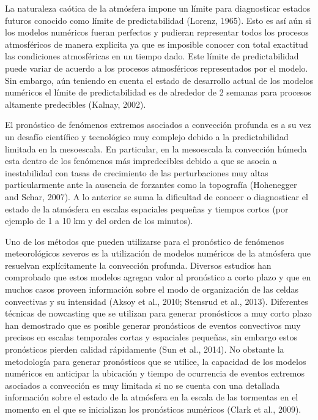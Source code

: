 \documentclass[12pt,oneside,a4paper]{reedthesis}
\begin{document}
La naturaleza caótica de la atmósfera impone un límite para diagnosticar estados futuros conocido como límite de predictabilidad (Lorenz, 1965). Esto es así aún si los modelos numéricos fueran perfectos y pudieran representar todos los procesos atmosféricos de manera explicita ya que es imposible conocer con total exactitud las condiciones atmosféricas en un tiempo dado. Este límite de predictabilidad puede variar de acuerdo a los procesos atmosféricos representados por el modelo. Sin embargo, aún teniendo en cuenta el estado de desarrollo actual de los modelos numéricos el límite de predictabilidad es de alrededor de 2 semanas para procesos altamente predecibles (Kalnay, 2002).

El pronóstico de fenómenos extremos asociados a convección profunda es a su vez un desafío científico y tecnológico muy complejo debido a la predictabilidad limitada en la mesoescala. En particular, en la mesoescala la convección húmeda esta dentro de los fenómenos más impredecibles debido a que se asocia a inestabilidad con tasas de crecimiento de las perturbaciones muy altas particularmente ante la ausencia de forzantes como la topografía (Hohenegger and Schar, 2007). A lo anterior se suma la dificultad de conocer o diagnosticar el estado de la atmósfera en escalas espaciales pequeñas y tiempos cortos (por ejemplo de 1 a 10 km y del orden de los minutos).

Uno de los métodos que pueden utilizarse para el pronóstico de fenómenos meteorológicos severos es la utilización de modelos numéricos de la atmósfera que resuelvan explícitamente la convección profunda. Diversos estudios han comprobado que estos modelos agregan valor al pronóstico a corto plazo y que en muchos casos proveen información sobre el modo de organización de las celdas convectivas y su intensidad (Aksoy et al., 2010; Stensrud et al., 2013). Diferentes técnicas de nowcasting que se utilizan para generar pronósticos a muy corto plazo han demostrado que es posible generar pronósticos de eventos convectivos muy precisos en escalas temporales cortas y espaciales pequeñas, sin embargo estos pronósticos pierden calidad rápidamente (Sun et al., 2014). No obstante la metodología para generar pronósticos que se utilice, la capacidad de los modelos numéricos en anticipar la ubicación y tiempo de ocurrencia de eventos extremos asociados a convección es muy limitada si no se cuenta con una detallada información sobre el estado de la atmósfera en la escala de las tormentas en el momento en el que se inicializan los pronósticos numéricos (Clark et al., 2009).
\end{document}
